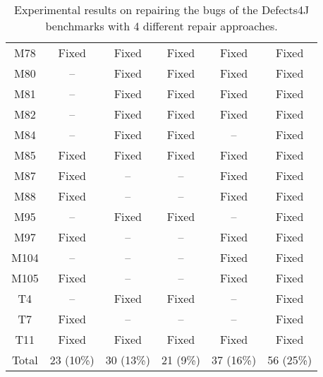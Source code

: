 \begin{table}[!t]
{\begin{tabular}{|c|c|c|c|c|c|}
M78               & Fixed     & Fixed     & Fixed     & Fixed     &Fixed   \\
M80               & --        & Fixed     & Fixed     & Fixed     &Fixed   \\
M81               & --        & Fixed     & Fixed     & Fixed     &Fixed   \\
M82               & --        & Fixed     & Fixed     & Fixed     &Fixed   \\
M84               & --        & Fixed     & Fixed     & --        &Fixed   \\
M85               & Fixed     & Fixed     & Fixed     & Fixed     &Fixed   \\
M87               & Fixed     & --        & --        & Fixed     &Fixed   \\
M88               & Fixed     & --        & --        & Fixed     &Fixed   \\
M95               & --        & Fixed     & Fixed     & --        &Fixed   \\
M97               & Fixed     & --        & --        & Fixed     &Fixed   \\
M104              & --        & --        & --        & Fixed     &Fixed   \\
M105              & Fixed     & --        & --        & Fixed     &Fixed   \\
\hline
T4                & --        & Fixed     & Fixed     & --        &Fixed   \\
T7                & Fixed     & --        & --        & --        &Fixed   \\
T11               & Fixed     & Fixed     & Fixed     & Fixed     &Fixed   \\
\hline
Total             & 23 (10\%) & 30 (13\%) & 21 (9\%)  & 37 (16\%) & 56 (25\%)\\
\hline 
\end{tabular}%
}
\caption{Experimental results on repairing the bugs of the Defects4J benchmarks with 4 different repair approaches.}
\end{table}
